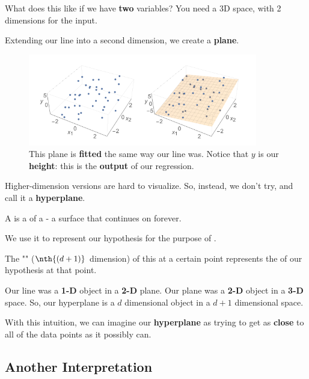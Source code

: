         What does this like if we have \textbf{two} variables? You need a 3D space, with 2 dimensions for the input.
        
        Extending our line into a second dimension, we create a \textbf{plane}.
        
        \begin{figure}[H]
        \centering
            \includegraphics[width=100mm,scale=0.5]{images/regression_images/Regression_Plane.png}
        
            \caption*{This plane is \textbf{fitted} the same way our line was. Notice that $y$ is our \textbf{height}: this is the \textbf{output} of our regression.}
        \end{figure}
        
        Higher-dimension versions are hard to visualize. So, instead, we don't try, and call it a \textbf{hyperplane}.\\
        
        \begin{definition}
            A  is a  of a  - a  surface that continues on forever.
            
            We use it to represent our  hypothesis for the purpose of . 
            
            The "" ($\nth{(d+1)}$ dimension) of this  at a certain point represents the  of our  hypothesis at that point.
        \end{definition}
        
        Our line was a \textbf{1-D} object in a \textbf{2-D} plane. Our plane was a \textbf{2-D} object in a \textbf{3-D} space. So, our hyperplane is a $d$ dimensional object in a $d+1$ dimensional space.
        
        With this intuition, we can imagine our \textbf{hyperplane} as trying to get as \textbf{close} to all of the data points as it possibly can.
        
    \subsection*{Another Interpretation}
    
